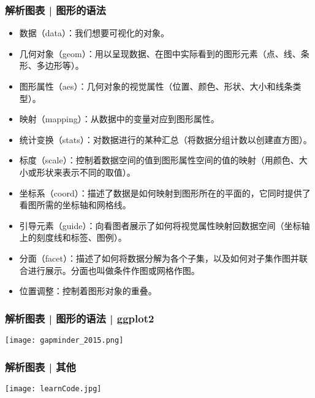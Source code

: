 \begin{frame}
  \frametitle{解析图表 | 图形的语法}
\begin{itemize}
  \item 数据（data）：我们想要可视化的对象。
  \item 几何对象（geom）：用以呈现数据、在图中实际看到的图形元素（点、线、条形、多边形等）。
  \item 图形属性（aes）：几何对象的视觉属性（位置、颜色、形状、大小和线条类型）。
  \item 映射（mapping）：从数据中的变量对应到图形属性。
  \item 统计变换（stats）：对数据进行的某种汇总（将数据分组计数以创建直方图）。
  \item 标度（scale）：控制着数据空间的值到图形属性空间的值的映射（用颜色、大小或形状来表示不同的取值）。
  \item 坐标系（coord）：描述了数据是如何映射到图形所在的平面的，它同时提供了看图所需的坐标轴和网格线。
  \item 引导元素（guide）：向看图者展示了如何将视觉属性映射回数据空间（坐标轴上的刻度线和标签、图例）。
  \item 分面（facet）：描述了如何将数据分解为各个子集，以及如何对子集作图并联合进行展示。分面也叫做条件作图或网格作图。
  \item 位置调整：控制着图形对象的重叠。
\end{itemize}
\end{frame}

\begin{frame}
  \frametitle{解析图表 | 图形的语法 | ggplot2}
  \begin{center}
    \texttt{[image: gapminder\_2015.png]}
  \end{center}
\end{frame}

\begin{frame}
  \frametitle{解析图表 | 其他}
  \begin{center}
    \texttt{[image: learnCode.jpg]}
  \end{center}
\end{frame}

